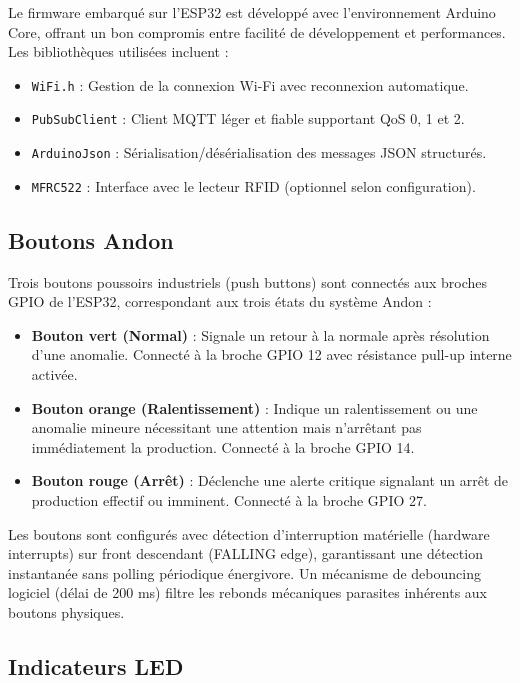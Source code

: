 Le firmware embarqué sur l'ESP32 est développé avec l'environnement Arduino Core, offrant un bon compromis entre facilité de développement et performances. Les bibliothèques utilisées incluent :

\begin{itemize}
    \item \texttt{WiFi.h} : Gestion de la connexion Wi-Fi avec reconnexion automatique.
    \item \texttt{PubSubClient} : Client MQTT léger et fiable supportant QoS 0, 1 et 2.
    \item \texttt{ArduinoJson} : Sérialisation/désérialisation des messages JSON structurés.
    \item \texttt{MFRC522} : Interface avec le lecteur RFID (optionnel selon configuration).
\end{itemize}

\subsection{Boutons Andon}

Trois boutons poussoirs industriels (push buttons) sont connectés aux broches GPIO de l'ESP32, correspondant aux trois états du système Andon :

\begin{itemize}
    \item \textbf{Bouton vert (Normal)} : Signale un retour à la normale après résolution d'une anomalie. Connecté à la broche GPIO 12 avec résistance pull-up interne activée.
    
    \item \textbf{Bouton orange (Ralentissement)} : Indique un ralentissement ou une anomalie mineure nécessitant une attention mais n'arrêtant pas immédiatement la production. Connecté à la broche GPIO 14.
    
    \item \textbf{Bouton rouge (Arrêt)} : Déclenche une alerte critique signalant un arrêt de production effectif ou imminent. Connecté à la broche GPIO 27.
\end{itemize}

Les boutons sont configurés avec détection d'interruption matérielle (hardware interrupts) sur front descendant (FALLING edge), garantissant une détection instantanée sans polling périodique énergivore. Un mécanisme de debouncing logiciel (délai de 200 ms) filtre les rebonds mécaniques parasites inhérents aux boutons physiques.


\subsection{Indicateurs LED}

